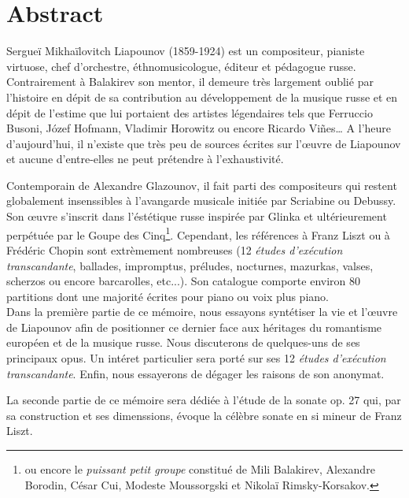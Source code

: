 
\chapter*{Abstract}

Sergueï Mikhaïlovitch Liapounov (1859-1924) est un compositeur, pianiste virtuose,
chef d'orchestre, éthnomusicologue, éditeur et pédagogue russe. Contrairement à
Balakirev son mentor, il demeure très largement oublié par l'histoire en dépit
de sa contribution au développement de la musique russe et en dépit de l'estime
que lui portaient des artistes légendaires tels que Ferruccio Busoni, Józef
Hofmann, Vladimir Horowitz ou encore Ricardo Vi\~{n}es\dots{} A l'heure d'aujourd'hui,
il n'existe que très peu de sources écrites sur l'œuvre de Liapounov et aucune
d'entre-elles ne peut prétendre à l'exhaustivité.

Contemporain de Alexandre Glazounov, il fait parti des compositeurs qui restent
globalement insenssibles à l'avangarde musicale initiée par Scriabine ou Debussy.
Son œuvre s'inscrit dans l'éstétique russe inspirée par Glinka et ultérieurement
perpétuée par le Goupe des Cinq\footnote{ou encore le \emph{puissant petit groupe}
constitué de Mili Balakirev, Alexandre Borodin, César Cui, Modeste Moussorgski
et Nikolaï Rimsky-Korsakov.}. Cependant, les références à Franz Liszt ou à Frédéric
Chopin sont extrèmement nombreuses (12 \emph{études d'exécution transcandante},
ballades, impromptus, préludes, nocturnes, mazurkas, valses, scherzos ou encore
barcarolles, etc...). Son catalogue comporte environ 80 partitions dont une
majorité écrites pour piano ou voix plus piano.\\

Dans la première partie de ce mémoire, nous essayons syntétiser la vie et
l'œuvre de Liapounov afin de positionner ce dernier face aux héritages du
romantisme européen et de la musique russe. Nous discuterons de quelques-uns
de ses principaux opus. Un intéret particulier sera porté sur ses 12
\emph{études d'exécution transcandante}. Enfin, nous essayerons de dégager les
raisons de son anonymat.

La seconde partie de ce mémoire sera dédiée à l'étude de la sonate op. 27 qui,
par sa construction et ses dimenssions, évoque la célèbre sonate en si mineur
de Franz Liszt.

